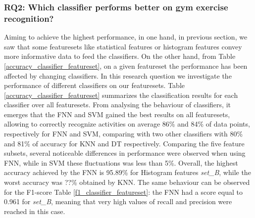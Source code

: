 \documentclass[journal,article,submit,moreauthors,pdftex]{Definitions/mdpi}
\newcommand{\hosein}[1]{\textcolor{orange}{{\it [Hosein: #1]}}}
\begin{document}
\subsubsection{RQ2: Which classifier performs better on gym exercise recognition?}
Aiming to achieve the highest performance, in one hand, in previous section, we saw that some featuresets like statistical features or histogram features convey more informative data to feed the classifiers. On the other hand, from Table \ref{accuracy_classifier_featureset}, on a given featureset the performance has been affected by changing classifiers. In this research question we investigate the performance of different classifiers on our featuresets. Table \ref{accuracy_classifier_featureset} summarizes the classification results for each classifier over all featuresets. From analysing the behaviour of classifiers, it emerges that the FNN and SVM gained the best results on all featuresets, allowing to correctly recognize activities on average 86\% and 84\% of data points, respectively for FNN and SVM, comparing with two other classifiers with 80\% and 81\% of accuracy for KNN and DT respectively. Comparing the five feature subsets, several noticeable differences in performance were observed when using FNN, while in SVM these fluctuations was less than 5\%. Overall, the highest accuracy achieved by the FNN is 95.89\% for Histogram features \textit{set\_B}, while the worst accuracy was ??\% obtained by KNN. The same behaviour can be observed for the F1-score Table \ref{f1_classifier_featureset}: the FNN had a score equal to 0.961 for \textit{set\_B}, meaning that very high values of recall and precision were reached in this case.
\end{document}
